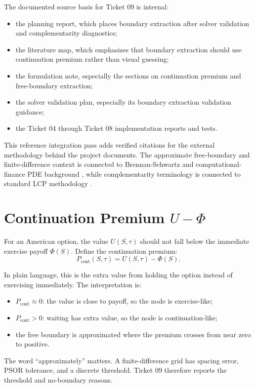 \documentclass[11pt,a4paper]{article}
\begin{document}
The documented source basis for Ticket 09 is internal:
\begin{itemize}
  \item the planning report, which places boundary extraction after solver validation and
  complementarity diagnostics;
  \item the literature map, which emphasizes that boundary extraction should use continuation
  premium rather than visual guessing;
  \item the formulation note, especially the sections on continuation premium and free-boundary
  extraction;
  \item the solver validation plan, especially its boundary extraction validation guidance;
  \item the Ticket 04 through Ticket 08 implementation reports and tests.
\end{itemize}

This reference integration pass adds verified citations for the external methodology behind the
project documents. The approximate free-boundary and finite-difference context is connected to
Brennan-Schwartz and computational-finance PDE background
\citep{brennan_schwartz_1977,wilmott_howison_dewynne_1995}, while complementarity terminology is
connected to standard LCP methodology \citep{cottle_pang_stone_2009}.

\section{Continuation Premium \(U-\Phi\)}

For an American option, the value \(U(S,\tau)\) should not fall below the immediate exercise
payoff \(\Phi(S)\). Define the continuation premium:
\[
P_{\mathrm{cont}}(S,\tau) = U(S,\tau) - \Phi(S).
\]

In plain language, this is the extra value from holding the option instead of exercising
immediately. The interpretation is:
\begin{itemize}
  \item \(P_{\mathrm{cont}} \approx 0\): the value is close to payoff, so the node is
  exercise-like;
  \item \(P_{\mathrm{cont}} > 0\): waiting has extra value, so the node is continuation-like;
  \item the free boundary is approximated where the premium crosses from near zero to positive.
\end{itemize}

The word ``approximately'' matters. A finite-difference grid has spacing error, PSOR tolerance,
and a discrete threshold. Ticket 09 therefore reports the threshold and no-boundary reasons.
\end{document}
